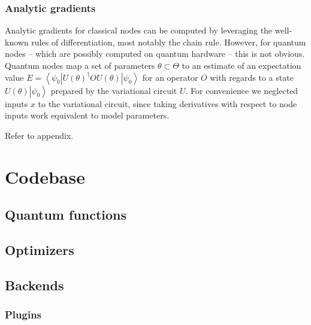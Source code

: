 \documentclass[aps,pra,10pt,twocolumn,groupedaddress,nofootinbib]{revtex4-1}
\theoremstyle{plain}
\newcommand{\ket}[1]{\ensuremath{\left| #1 \right \rangle}}
\newcommand{\bra}[1]{\ensuremath{\left \langle #1 \right |}}
\begin{document}
\subsubsection{Analytic gradients}
Analytic gradients for classical nodes can be computed by leveraging the well-known rules of differentiation, most notably the chain rule. However, for quantum nodes -- which are possibly computed on quantum hardware -- this is not obvious. Quantum nodes map a set of parameters  $\theta \subset \Theta$ to an estimate of an expectation value $E = \bra{\psi_0} U(\theta)^{\dagger} O U(\theta) \ket{\psi_0}$ for an operator $O$ with regards to a state $U(\theta) \ket{\psi_0}$ prepared by the variational circuit $U$. For convenience we neglected inputs $x$ to the variational circuit, since taking derivatives with respect to node inputs work equivalent to model parameters.



Refer to appendix.

\section{Codebase}

\subsection{Quantum functions}

\subsection{Optimizers}

\subsection{Backends}
\subsubsection{Plugins}
\end{document}
